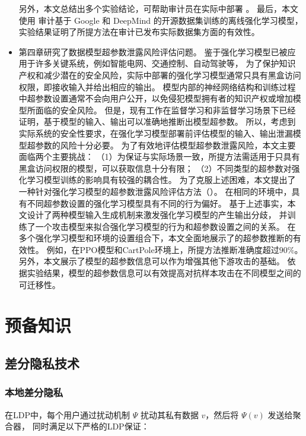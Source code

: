 \begin{itemize}
    另外，本文总结出多个实验结论，可帮助审计员在实际中部署 \sysnameo 。
    最后，本文使用 \sysnameo 审计基于 Google 和 DeepMind 的开源数据集训练的离线强化学习模型，
    实验结果证明了所提方法在审计已发布实际数据集方面的有效性。
    \item 第四章研究了数据模型超参数泄露风险评估问题。
    鉴于强化学习模型已被应用于许多关键系统，例如智能电网、交通控制、自动驾驶等，
    为了保护知识产权和减少潜在的安全风险，实际中部署的强化学习模型通常只具有黑盒访问权限，即接收输入并给出相应的输出。
    模型内部的神经网络结构和训练过程中超参数设置通常不会向用户公开，以免侵犯模型拥有者的知识产权或增加模型所面临的安全风险。
    但是，现有工作在监督学习和非监督学习场景下已经证明，基于模型的输入、输出可以准确地推断出模型超参数。
    所以，考虑到实际系统的安全性要求，在强化学习模型部署前评估模型的输入、输出泄漏模型超参数的风险十分必要。
    为了有效地评估模型超参数泄露风险，本文主要面临两个主要挑战：
    （1）为保证与实际场景一致，所提方法需适用于只具有黑盒访问权限的模型，可以获取信息十分有限；
    （2）不同类型的超参数对强化学习模型训练的影响具有较强的耦合性。
    为了克服上述困难，本文提出了一种针对强化学习模型的超参数泄露风险评估方法（\sysname）。
    在相同的环境中，具有不同超参数设置的强化学习模型具有不同的行为偏好。
    基于上述事实，本文设计了两种模型输入生成机制来激发强化学习模型的产生输出分歧，
    并训练了一个攻击模型来拟合强化学习模型的行为和超参数设置之间的关系。
    在多个强化学习模型和环境的设置组合下，本文全面地展示了\sysname 的超参数推断的有效性。
    例如，在PPO模型和CartPole环境上，所提方法推断准确度超过$90\%$。
    另外，本文展示了模型的超参数信息可以作为增强其他下游攻击的基础。
    依据实验结果，模型的超参数信息可以有效提高对抗样本攻击在不同模型之间的可迁移性。
\end{itemize}

\chapter{预备知识}
\section{差分隐私技术}
\subsection{本地差分隐私}
在LDP中，每个用户通过扰动机制 $\Psi$ 扰动其私有数据 $v$，然后将 $\Psi(v)$ 发送给聚合器，
同时满足以下严格的LDP保证：

